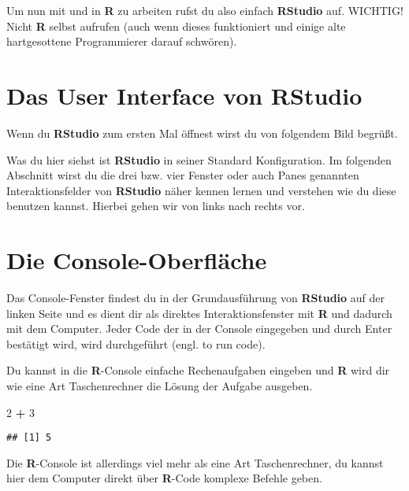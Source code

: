 \documentclass[
]{book}
\newenvironment{Shaded}{\begin{snugshade}}{\end{snugshade}}
\newcommand{\DecValTok}[1]{\textcolor[rgb]{0.00,0.00,0.81}{#1}}
\newcommand{\OperatorTok}[1]{\textcolor[rgb]{0.81,0.36,0.00}{\textbf{#1}}}
\newcommand{\StringTok}[1]{\textcolor[rgb]{0.31,0.60,0.02}{#1}}
\begin{document}
Um nun mit und in \textbf{R} zu arbeiten rufst du also einfach \textbf{RStudio} auf. WICHTIG! Nicht \textbf{R} selbst aufrufen (auch wenn dieses funktioniert und einige alte hartgesottene Programmierer darauf schwören).

\hypertarget{das-user-interface-von-rstudio}{%
\section{Das User Interface von RStudio}\label{das-user-interface-von-rstudio}}

Wenn du \textbf{RStudio} zum ersten Mal öffnest wirst du von folgendem Bild begrüßt.

Was du hier siehst ist \textbf{RStudio} in seiner Standard Konfiguration. Im folgenden Abschnitt wirst du die drei bzw. vier Fenster oder auch Panes genannten Interaktionsfelder von \textbf{RStudio} näher kennen lernen und verstehen wie du diese benutzen kannst. Hierbei gehen wir von links nach rechts vor.

\hypertarget{die-console-oberfluxe4che}{%
\section{Die Console-Oberfläche}\label{die-console-oberfluxe4che}}

Das Console-Fenster findest du in der Grundausführung von \textbf{RStudio} auf der linken Seite und es dient dir als direktes Interaktionsfenster mit \textbf{R} und dadurch mit dem Computer. Jeder Code der in der Console eingegeben und durch Enter bestätigt wird, wird durchgeführt (engl. to run code).

Du kannst in die \textbf{R}-Console einfache Rechenaufgaben eingeben und \textbf{R} wird dir wie eine Art Taschenrechner die Lösung der Aufgabe ausgeben.

\begin{Shaded}
\begin{Highlighting}[]
\DecValTok{2} \OperatorTok{+}\StringTok{ }\DecValTok{3}
\end{Highlighting}
\end{Shaded}

\begin{verbatim}
## [1] 5
\end{verbatim}

Die \textbf{R}-Console ist allerdings viel mehr als eine Art Taschenrechner, du kannst hier dem Computer direkt über \textbf{R}-Code komplexe Befehle geben.
\end{document}
